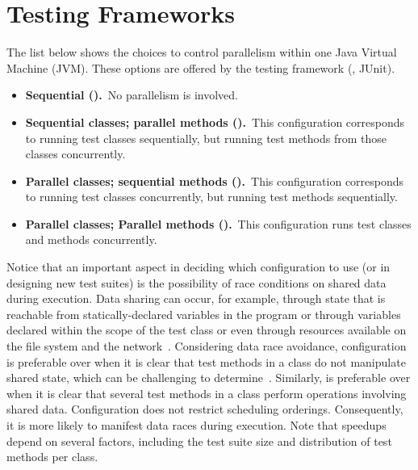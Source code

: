 \section{Testing Frameworks}
\label{sec:frameworks}

The list below shows the choices to control parallelism within one
Java Virtual Machine (JVM).  These options are offered by the testing
framework (\eg{}, JUnit).

\begin{itemize}
\item
    \textbf{Sequential (\Seq).}~No parallelism is involved.
\item
    \textbf{Sequential classes; parallel methods
      (\SeqClassParMeth).}~This configuration corresponds to running
    test classes sequentially, but running test methods from those
    classes concurrently.
\item
    \textbf{Parallel classes; sequential methods
      (\ParClassSeqMeth{}).}~This configuration corresponds to running
    test classes concurrently, but running test methods sequentially.
\item
    \textbf{Parallel classes; Parallel methods
      (\ParClassParMeth).}~This configuration runs test classes and
    methods concurrently.
\end{itemize}

Notice that an important aspect in deciding which configuration to use (or in
designing new test suites) is the possibility of race conditions on shared data
during execution.  Data sharing can occur, for example, through state that is
reachable from statically-declared variables in the program or through variables
declared within the scope of the test class or even through resources available
on the file system and the network~\cite{luo-etal-fse2014}.  Considering data
race avoidance, configuration \SeqClassParMeth{} is preferable over
\ParClassSeqMeth{} when it is clear that test methods in a class do not
manipulate shared state, which can be challenging to
determine~\cite{bell-etal-esecfse2015}.  Similarly, \ParClassSeqMeth{} is
preferable over \SeqClassParMeth{} when it is clear that several test methods in
a class perform operations involving shared data.  Configuration
\ParClassParMeth{} does not restrict scheduling orderings.  Consequently, it is
more likely to manifest data races during execution. Note that speedups depend
on several factors, including the test suite size and distribution of test
methods per class.

